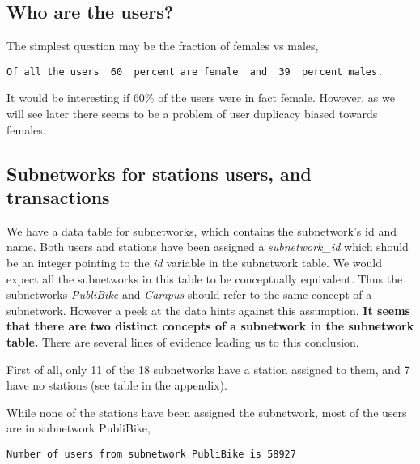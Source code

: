 \documentclass{report}
\begin{document}
    



    \subsection{Who are the users?}\label{who-are-the-users}

The simplest question may be the fraction of females vs males,


    \begin{Verbatim}[commandchars=\\\{\}]
Of all the users  60  percent are female  and  39  percent males.
    \end{Verbatim}

    It would be interesting if 60\% of the users were in fact female.
However, as we will see later there seems to be a problem of user
duplicacy biased towards females.

    \subsection{Subnetworks for stations users, and
transactions}\label{subnetworks-for-stations-users-and-transactions}

We have a data table for subnetworks, which contains the subnetwork's id
and name. Both users and stations have been assigned a
\emph{subnetwork\_id} which should be an integer pointing to the
\emph{id} variable in the subnetwork table. We would expect all the
subnetworks in this table to be conceptually equivalent. Thus the
subnetworks \emph{PubliBike} and \emph{Campus} should refer to the same
concept of a subnetwork. However a peek at the data hints against this
assumption. \textbf{It seems that there are two distinct concepts of a
subnetwork in the subnetwork table.} There are several lines of evidence
leading us to this conclusion.

First of all, only 11 of the 18 subnetworks have a station assigned to
them, and 7 have no stations (see table in the appendix).



    While none of the stations have been assigned the subnetwork, most of
the users are in subnetwork PubliBike,


    \begin{Verbatim}[commandchars=\\\{\}]
Number of users from subnetwork PubliBike is 58927
    \end{Verbatim}
\end{document}
